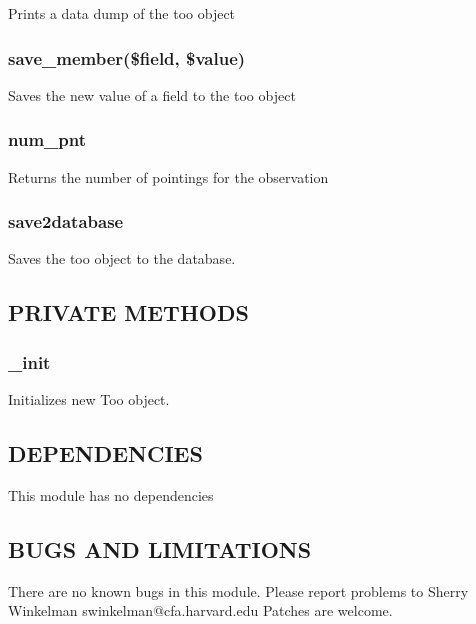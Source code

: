 \documentclass{article}
\begin{document}
Prints a data dump of the too object

\subsubsection*{save\_member(\$field, \$value)\label{Too_save_member_field_value_}}


Saves the new value of a field to the too object

\subsubsection*{num\_pnt\label{Too_num_pnt}}


Returns the number of pointings for the observation

\subsubsection*{save2database\label{Too_save2database}}


Saves the too object to the database.

\subsection*{PRIVATE METHODS\label{Too_PRIVATE_METHODS}}
\subsubsection*{\_init\label{Too__init}}


Initializes new Too object.

\subsection*{DEPENDENCIES\label{Too_DEPENDENCIES}}


This module has no dependencies

\subsection*{BUGS AND LIMITATIONS\label{Too_BUGS_AND_LIMITATIONS}}


There are no known bugs in this module.
Please report problems to Sherry Winkelman swinkelman@cfa.harvard.edu
Patches are welcome.
\end{document}
